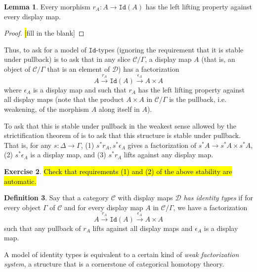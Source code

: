 \documentclass{article}
\theoremstyle{definition}
\newtheorem{definition}{Definition}[section]
\newtheorem{lemma}[definition]{Lemma}
\newtheorem{exercise}[definition]{Exercise}
\newcommand{\C}{\mathcal C}
\newcommand{\D}{\mathcal D}
\newcommand{\Id}{\mathtt {Id}}
\begin{document}
\begin{lemma}
    Every morphism $r_A: A \to \Id(A)$ has the left lifting property against every display map.
\end{lemma}
\begin{proof}
    \hl[fill in the blank]
\end{proof}

Thus, to ask for a model of $\Id$-types (ignoring the requirement that it is stable under pullback) is to ask that in any slice $\C / \Gamma$, a display map $A$ (that is, an object of $\C / \Gamma$ that is an element of $\D$) has a factorization 
\[ A \xrightarrow{r_A} \Id(A) \xrightarrow{\epsilon_A} A \times A \] 
where $\epsilon_A$ is a display map and such that $r_A$ has the left lifting property against all display maps (note that the product $A \times A$ in $\C / \Gamma$ is the pullback, i.e. weakening, of the morphism $A$ along itself in $A$). 

To ask that this is stable under pullback in the weakest sense allowed by the strictification theorem of \cite{lumsdaine-warren} is to ask that this structure is stable under pullback. 
That is, for any $s: \Delta \to \Gamma$, 
(1) $s^* r_A  , s^* \epsilon_A$ gives a factorization of $s^* A \to s^* A \times s^* A$, 
(2) $s^* \epsilon_A$ is a display map, and 
(3) $s^* r_A$ lifts against any display map.

\begin{exercise}
    \hl{Check that requirements (1) and (2) of the above stability are automatic.}
\end{exercise}

\begin{definition}
    Say that a category $\C$ with display maps $\D$ \emph{has identity types} if for every object $\Gamma$ of $\C$ and for every display map $A$ in $\C / \Gamma$, we have a factorization
    \[ A \xrightarrow{r_A} \Id(A) \xrightarrow{\epsilon_A} A \times A \] 
    such that any pullback of $r_A$ lifts against all display maps and $\epsilon_A$ is a display map.
\end{definition}

A model of identity types is equivalent to a certain kind of \emph{weak factorization system}, a structure that is a cornerstone of categorical homotopy theory.
\end{document}
